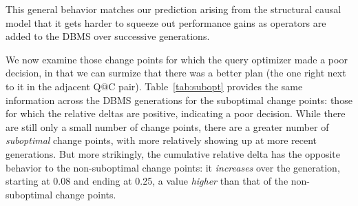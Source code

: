 \documentclass[prodmode,acmtods]{acmsmall}
\begin{document}
This general behavior matches our prediction arising from the structural causal model that it
gets harder to squeeze out performance gains as operators are added to the
\hbox{DBMS} over successive generations.

We now examine those change points for which the query optimizer made a poor
decision, in that we can surmize that there was a better plan (the one right
next to it in the adjacent Q@C pair). Table~\ref{tab:subopt} provides the
same information across the \hbox{DBMS} generations for the suboptimal change
points: those for which the
  relative deltas are positive, indicating a poor decision. While there are
  still only a small number of change points, there are a greater number of
  {\em suboptimal} change points, with more relatively showing up at more
  recent generations. But more strikingly, the cumulative relative delta has
  the opposite behavior to the non-suboptimal change points: it {\em
    increases} over the generation, starting at 0.08 and ending at 0.25, a
  value {\em higher} than that of the non-suboptimal change points.

\begin{table}
[t]
\end{table}
\end{document}
